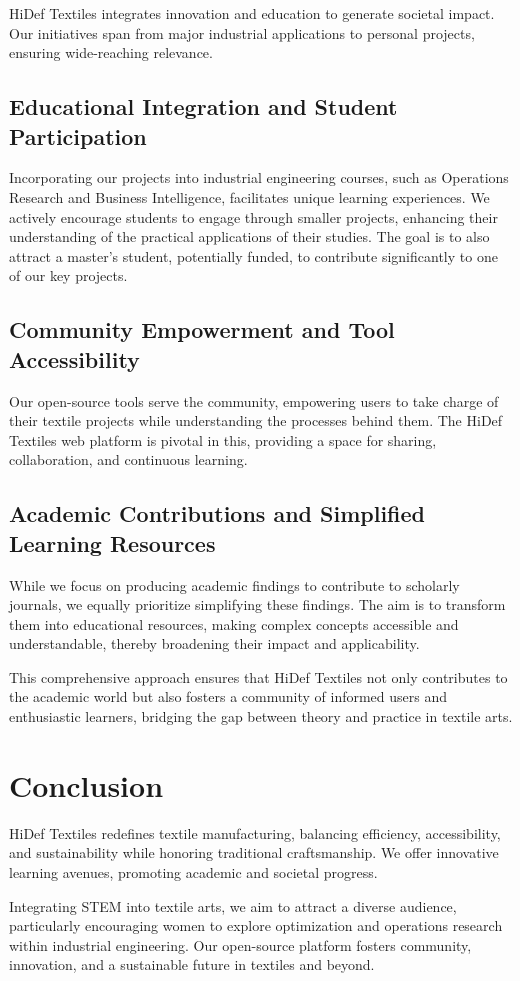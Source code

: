 \documentclass{article}
\begin{document}
    HiDef Textiles integrates innovation and education to generate societal impact.
    Our initiatives span from major industrial applications to personal projects, ensuring wide-reaching relevance.

    \subsection{Educational Integration and Student Participation}

    Incorporating our projects into industrial engineering courses,
    such as Operations Research and Business Intelligence, facilitates unique learning experiences.
    We actively encourage students to engage through smaller projects, enhancing their understanding of the
    practical applications of their studies. The goal is to also attract a master's student, potentially funded,
    to contribute significantly to one of our key projects.

    \subsection{Community Empowerment and Tool Accessibility}

    Our open-source tools serve the community, empowering users to take charge of their textile projects
    while understanding the processes behind them.
    The HiDef Textiles web platform is pivotal in this, providing a space for sharing, collaboration,
    and continuous learning.

    \subsection{Academic Contributions and Simplified Learning Resources}

    While we focus on producing academic findings to contribute to scholarly journals, we equally
    prioritize simplifying these findings. The aim is to transform them into educational resources,
    making complex concepts accessible and understandable, thereby broadening their impact and applicability.

    This comprehensive approach ensures that HiDef Textiles not only contributes to the academic world
    but also fosters a community of informed users and enthusiastic learners,  bridging the gap between theory and
    practice in textile arts.


    \section{Conclusion}

    HiDef Textiles redefines textile manufacturing, balancing efficiency, accessibility, and sustainability
    while honoring traditional craftsmanship.
    We offer innovative learning avenues, promoting academic and societal progress.

    Integrating STEM into textile arts, we aim to attract a diverse audience,
    particularly encouraging women to explore optimization and operations research within industrial engineering.
    Our open-source platform fosters community, innovation, and a sustainable future in textiles and beyond.

    \newpage
    
\end{document}
